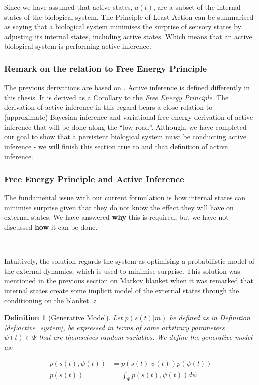 \documentclass{article}
\newtheorem{definition}{Definition}
\begin{document}
Since we have assumed that active states, $a(t)$, are a subset of the internal states of the biological system. The Principle of Least Action can be summarised as saying that a biological system minimises the surprise of sensory states by adjusting its internal states, including active states. Which means that an active biological system is performing active inference. 

\subsubsection{Remark on the relation to Free Energy Principle}

The previous derivations are based on \citet{friston2012active}. Active inference is defined differently in this thesis. It is derived as a Corollary to the \textit{Free Energy Principle}. The derivation of active inference in this regard bears a close relation to (approximate) Bayesian inference and variational free energy derivation of active inference that will be done along the ``low road''. Although, we have completed our goal to show that a persistent biological system must be conducting active inference - we will finish this section true to \citet{friston2012free} and that definition of active inference.

\subsubsection{Free Energy Principle and Active Inference}

The fundamental issue with our current formulation is how internal states can minimise surprise given that they do not know the effect they will have on external states. We have answered \textbf{why} this is required, but we have not discussed \textbf{how} it can be done.

\

Intuitively, the solution regards the system as optimising a probabilistic model of the external dynamics, which is used to minimise surprise. This solution was mentioned in the previous section on Markov blanket when it was remarked that internal states create some implicit model of the external states through the conditioning on the blanket. z

\begin{definition}[Generative Model]\label{def:generative_model}
Let $p(s(t)|m)$ be defined as in Definition \ref{def:active_system}, be expressed in terms of some arbitrary parameters $\psi(t) \in \Psi$ that are themselves random variables. We define the generative model as:

\begin{equation*}
	\begin{aligned}
		p(s(t), \psi(t)) &= p(s(t)|\psi(t))p(\psi(t)) \\
		p(s(t)) &= \int_\Psi p(s(t), \psi(t)) d\psi
	\end{aligned}
\end{equation*}
\end{definition}
\end{document}
